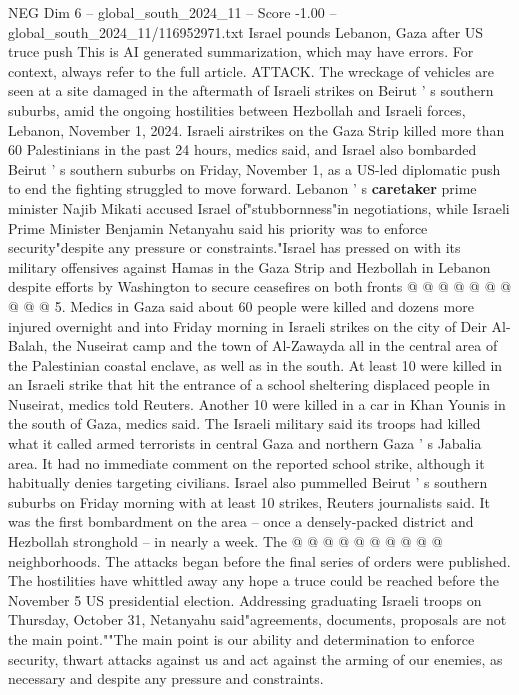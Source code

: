 \begin{textsample}{NEG Dim 6 – global\_south\_2024\_11 – Score -1.00 – global\_south\_2024\_11/116952971.txt}  \label{ex:f6_neg_067}
Israel pounds Lebanon, Gaza after US truce push This is AI generated summarization, which may have errors.
For context, always refer to the full article.
ATTACK.
The wreckage of vehicles are seen at a site damaged in the aftermath of Israeli strikes on Beirut ' s southern suburbs, amid the ongoing hostilities between Hezbollah and Israeli forces, Lebanon, November 1, 2024.
Israeli airstrikes on the Gaza Strip killed more than 60 Palestinians in the past 24 hours, medics said, and Israel also bombarded Beirut ' s southern suburbs on Friday, November 1, as a US-led diplomatic push to end the fighting struggled to move forward.
Lebanon ' s \textbf{caretaker} prime minister Najib Mikati accused Israel of"stubbornness"in negotiations, while Israeli Prime Minister Benjamin Netanyahu said his priority was to enforce security"despite any pressure or constraints."Israel has pressed on with its military offensives against Hamas in the Gaza Strip and Hezbollah in Lebanon despite efforts by Washington to secure ceasefires on both fronts @ @ @ @ @ @ @ @ @ @ 5.
Medics in Gaza said about 60 people were killed and dozens more injured overnight and into Friday morning in Israeli strikes on the city of Deir Al-Balah, the Nuseirat camp and the town of Al-Zawayda all in the central area of the Palestinian coastal enclave, as well as in the south.
At least 10 were killed in an Israeli strike that hit the entrance of a school sheltering displaced people in Nuseirat, medics told Reuters.
Another 10 were killed in a car in Khan Younis in the south of Gaza, medics said.
The Israeli military said its troops had killed what it called armed terrorists in central Gaza and northern Gaza ' s Jabalia area.
It had no immediate comment on the reported school strike, although it habitually denies targeting civilians.
Israel also pummelled Beirut ' s southern suburbs on Friday morning with at least 10 strikes, Reuters journalists said.
It was the first bombardment on the area -- once a densely-packed district and Hezbollah stronghold -- in nearly a week.
The @ @ @ @ @ @ @ @ @ @ neighborhoods.
The attacks began before the final series of orders were published.
The hostilities have whittled away any hope a truce could be reached before the November 5 US presidential election.
Addressing graduating Israeli troops on Thursday, October 31, Netanyahu said"agreements, documents, proposals are not the main point.""The main point is our ability and determination to enforce security, thwart attacks against us and act against the arming of our enemies, as necessary and despite any pressure and constraints.

\end{textsample}
